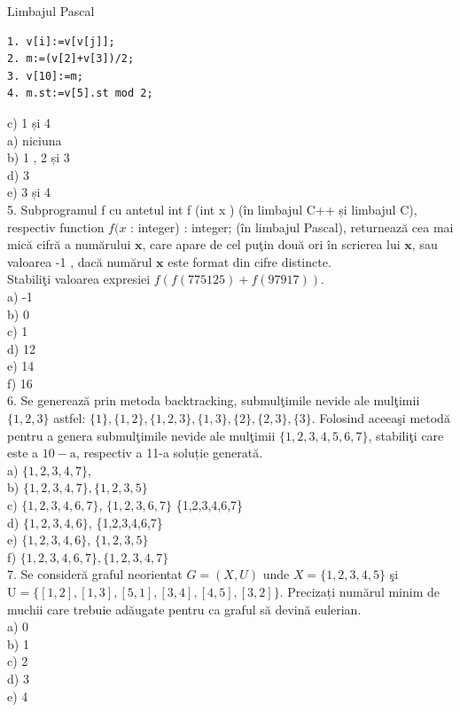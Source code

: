 \documentclass[10pt]{article}
\begin{document}
Limbajul Pascal

\begin{verbatim}
1. v[i]:=v[v[j]];
2. m:=(v[2]+v[3])/2;
3. v[10]:=m;
4. m.st:=v[5].st mod 2;
\end{verbatim}

c) 1 și 4\\
a) niciuna\\
b) 1 , 2 și 3\\
d) 3\\
e) 3 și 4\\
5. Subprogramul f cu antetul int f (int x ) (în limbajul C++ și limbajul C), respectiv function $f(x$ : integer) : integer; (în limbajul Pascal), returnează cea mai mică cifră a numărului $\mathbf{x}$, care apare de cel puţin două ori în scrierea lui $\mathbf{x}$, sau valoarea -1 , dacă numărul $\mathbf{x}$ este format din cifre distincte.\\
Stabiliţi valoarea expresiei $f(f(775125)+f(97917))$.\\
a) -1\\
b) 0\\
c) 1\\
d) 12\\
e) 14\\
f) 16\\
6. Se generează prin metoda backtracking, submulţimile nevide ale mulţimii $\{1,2,3\}$ astfel: $\{1\},\{1,2\},\{1,2,3\},\{1,3\},\{2\},\{2,3\},\{3\}$. Folosind aceeaşi metodă pentru a genera submulţimile nevide ale mulţimii $\{1,2,3,4,5,6,7\}$, stabiliţi care este a $10-\mathrm{a}$, respectiv a 11-a soluție generată.\\
a) $\{1,2,3,4,7\}$,\\
b) $\{1,2,3,4,7\},\{1,2,3,5\}$\\
c) $\{1,2,3,4,6,7\}$, $\{1,2,3,6,7\}$ \{1,2,3,4,6,7\}\\
d) $\{1,2,3,4,6\}$, \{1,2,3,4,6,7\}\\
e) $\{1,2,3,4,6\}$, $\{1,2,3,5\}$\\
f) $\{1,2,3,4,6,7\},\{1,2,3,4,7\}$\\
7. Se consideră graful neorientat $G=(X, U)$ unde $X=\{1,2,3,4,5\}$ şi $\mathrm{U}=\{[1,2],[1,3],[5,1],[3,4],[4,5],[3,2]\}$. Precizați numărul minim de muchii care trebuie adăugate pentru ca graful să devină eulerian.\\
a) 0\\
b) 1\\
c) 2\\
d) 3\\
e) 4\\
\end{document}

